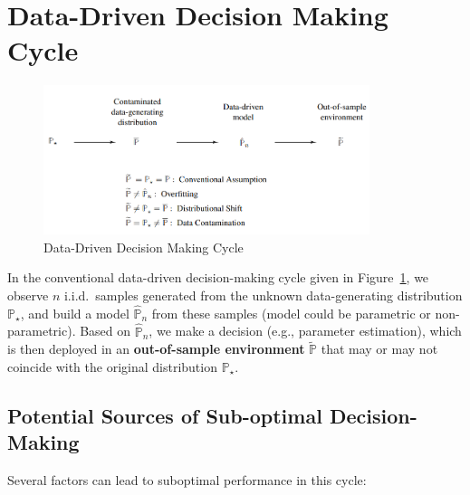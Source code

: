 \documentclass[11pt]{report}
\begin{document}
\section{Data-Driven Decision Making Cycle}
\begin{figure}[h]
    \centering
    \includegraphics[width=0.85\textwidth]{images/img1.png}
    \caption{Data-Driven Decision Making Cycle}
    \label{fig1}
\end{figure}
In the conventional data-driven decision-making cycle given in Figure~\ref{fig1}, we observe $n$ i.i.d.\ samples generated from the unknown data-generating distribution $\mathbb{P}_\star$, and build a model $\hat{\mathbb{P}}_n$ from these samples (model could be parametric or non-parametric). Based on $\hat{\mathbb{P}}_n$, we make a decision (e.g., parameter estimation), which is then deployed in an \textbf{out-of-sample environment} $\tilde{\mathbb{P}}$ that may or may not coincide with the original distribution $\mathbb{P}_\star$.

\subsection{Potential Sources of Sub-optimal Decision-Making}
Several factors can lead to suboptimal performance in this cycle:
\end{document}
